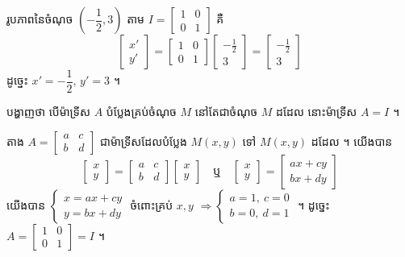\begin{example}[ឧទាហរណ៍ ២]
រូបភាពនៃចំណុច $\left(-\dfrac{1}{2}, 3\right)$ តាម $I = \begin{bmatrix} 1 & 0\\ 0 & 1 \end{bmatrix}$ គឺ
\[ \begin{bmatrix} x'\\ y' \end{bmatrix} = \begin{bmatrix} 1 & 0\\ 0 & 1 \end{bmatrix}\begin{bmatrix} -\frac{1}{2}\\ 3 \end{bmatrix} = \begin{bmatrix} -\frac{1}{2}\\ 3 \end{bmatrix} \]
ដូច្នេះ $x' = -\dfrac{1}{2}$, $y' = 3$ ។
\end{example}

\begin{example}[លំហាត់គំរូ ១]
បង្ហាញថា បើម៉ាទ្រីស $A$ បំប្លែងគ្រប់ចំណុច $M$ នៅតែជាចំណុច $M$ ដដែល នោះម៉ាទ្រីស $A = I$ ។
\end{example}
\ans
តាង $A = \begin{bmatrix} a & c\\ b & d \end{bmatrix}$ ជាម៉ាទ្រីសដែលបំប្លែង $M(x, y)$ ទៅ $M(x, y)$ ដដែល ។ យើងបាន
\[ \begin{bmatrix} x\\ y \end{bmatrix} = \begin{bmatrix} a & c\\ b & d \end{bmatrix}\begin{bmatrix} x\\ y \end{bmatrix} \quad\text{ឬ}\quad \begin{bmatrix} x\\ y \end{bmatrix} = \begin{bmatrix} ax + cy\\ bx + dy \end{bmatrix} \]
យើងបាន $\begin{cases} x = ax + cy\\ y = bx + dy \end{cases}$ ចំពោះគ្រប់ $x, y$ $\Rightarrow \begin{cases} a = 1, \ c = 0\\ b = 0, \ d = 1 \end{cases}$ ។ ដូច្នេះ $A = \begin{bmatrix} 1 & 0\\ 0 & 1 \end{bmatrix} = I$ ។

